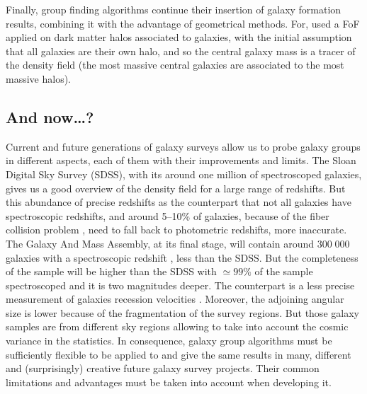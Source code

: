 Finally, group finding algorithms continue their insertion of galaxy formation
results, combining it with the advantage of geometrical methods. For,
\citet{MunozCuartas+12} used a FoF applied on dark matter halos associated
to galaxies, with the initial assumption that all galaxies are their own halo,
and so the central galaxy mass is a tracer of the density field (the most
massive central galaxies are associated to the most massive halos).

\subsection{And now\ldots?}
\label{sub:and_now}

Current and future generations of galaxy surveys allow us to probe galaxy
groups in different aspects, each of them with their improvements and limits.
The Sloan Digital Sky Survey (SDSS), with its around one million of
spectroscoped galaxies, gives us a good overview of the density field for a
large range of redshifts. But this abundance of precise redshifts as the
counterpart that not all galaxies have spectroscopic redshifts, and around
5--10\% of galaxies, because of the fiber collision problem \citep{Blanton+03},
need to fall back to photometric redshifts, more inaccurate. The Galaxy And
Mass Assembly, at its final stage, will contain around $300\;000$ galaxies with
a spectroscopic redshift \citep{Hopkins+13}, less than the SDSS\@. But the
completeness of the sample will be higher than the SDSS with $\simeq99\%$ of
the sample spectroscoped and it is two magnitudes deeper. The counterpart is a
less precise measurement of galaxies recession velocities
\citep{Robotham+11,Hopkins+13}. Moreover, the adjoining angular size is lower
because of the fragmentation of the survey regions. But those galaxy samples
are from different sky regions allowing to take into account the cosmic
variance in the statistics. In consequence, galaxy group algorithms must be
sufficiently flexible to be applied to and give the same results in many,
different and (surprisingly) creative future galaxy survey projects. Their
common limitations and advantages must be taken into account when developing
it.

